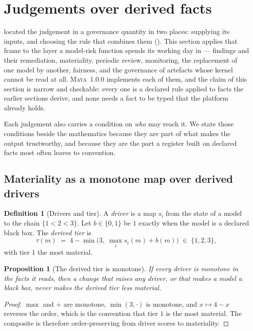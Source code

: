 \documentclass[11pt,a4paper]{article}
\renewcommand{\_}{\oldunderscore\allowbreak}
\theoremstyle{plain}
\newtheorem{proposition}[theorem]{Proposition}
\theoremstyle{definition}
\newtheorem{definition}[theorem]{Definition}
\theoremstyle{definition}
\theoremstyle{remark}
\newcommand{\defn}[1]{\emph{#1}}
\begin{document}
\section{Judgements over derived facts}\label{sec:judgements}

 located the judgement in a governance quantity in two places: supplying its inputs,
and choosing the rule that combines them (). This section applies that frame to the
layer a model-risk function spends its working day in --- findings and their remediation, materiality,
periodic review, monitoring, the replacement of one model by another, fairness, and the governance of
artefacts whose kernel cannot be read at all. \textsc{Maya}~1.0.0 implements each of them, and the claim of
this section is narrow and checkable: every one is a declared rule applied to facts the earlier sections
derive, and none needs a fact to be typed that the platform already holds.

Each judgement also carries a condition on \emph{who} may reach it. We state those conditions beside the
mathematics because they are part of what makes the output trustworthy, and because they are the part a
register built on declared facts most often leaves to convention.

\subsection{Materiality as a monotone map over derived drivers}

\begin{definition}[Drivers and tier]\label{def:tier}
A \defn{driver} is a map $s_i$ from the state of a model to the chain $\{1 < 2 < 3\}$. Let $b \in \{0,1\}$
be $1$ exactly when the model is a declared black box. The \defn{derived tier} is
\[
  \tau(m) \;=\; 4 - \min\!\bigl(3,\; \max_i s_i(m) + b(m)\bigr) \;\in\; \{1,2,3\},
\]
with tier $1$ the most material.
\end{definition}

\begin{proposition}[The derived tier is monotone]\label{prop:tiermono}
If every driver is monotone in the facts it reads, then a change that raises any driver, or that makes a
model a black box, never makes the derived tier less material.
\end{proposition}

\begin{proof}
$\max$ and $+$ are monotone, $\min(3,\cdot)$ is monotone, and $x \mapsto 4-x$ reverses the order, which
is the convention that tier $1$ is the most material. The composite is therefore order-preserving from
driver scores to materiality.
\end{proof}
\end{document}
